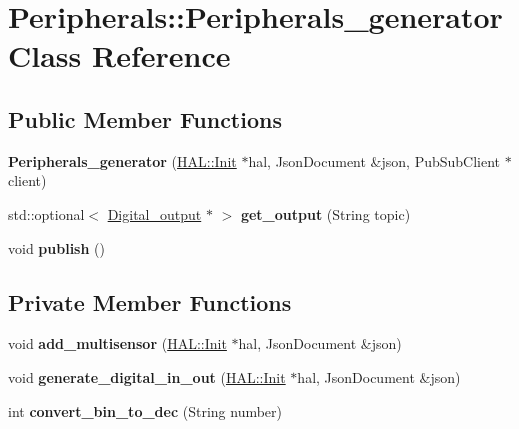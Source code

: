 \hypertarget{class_peripherals_1_1_peripherals__generator}{}\section{Peripherals\+:\+:Peripherals\+\_\+generator Class Reference}
\label{class_peripherals_1_1_peripherals__generator}
\subsection*{Public Member Functions}
\begin{DoxyCompactItemize}
\item 
\mbox{\label{class_peripherals_1_1_peripherals__generator_a9f156c7494e728e720176d6a83c3603d}} 
{\bfseries Peripherals\+\_\+generator} (\hyperlink{class_h_a_l_1_1_init}{H\+A\+L\+::\+Init} $\ast$hal, Json\+Document \&json, Pub\+Sub\+Client $\ast$client)
\item 
\mbox{\label{class_peripherals_1_1_peripherals__generator_a9b9652069a5641aa66d79716b4a946d8}} 
std\+::optional$<$ \hyperlink{class_peripherals_1_1_digital__output}{Digital\+\_\+output} $\ast$ $>$ {\bfseries get\+\_\+output} (String topic)
\item 
\mbox{\label{class_peripherals_1_1_peripherals__generator_a7fee2f98b8ab0fd7aee2fc057a46e9f7}} 
void {\bfseries publish} ()
\end{DoxyCompactItemize}
\subsection*{Private Member Functions}
\begin{DoxyCompactItemize}
\item 
\mbox{\label{class_peripherals_1_1_peripherals__generator_a4626f759446503e34e0acbf50d1887fc}} 
void {\bfseries add\+\_\+multisensor} (\hyperlink{class_h_a_l_1_1_init}{H\+A\+L\+::\+Init} $\ast$hal, Json\+Document \&json)
\item 
\mbox{\label{class_peripherals_1_1_peripherals__generator_a84f9a2a0c6594ec1cf4002b5679804af}} 
void {\bfseries generate\+\_\+digital\+\_\+in\+\_\+out} (\hyperlink{class_h_a_l_1_1_init}{H\+A\+L\+::\+Init} $\ast$hal, Json\+Document \&json)
\item 
\mbox{\label{class_peripherals_1_1_peripherals__generator_a0351544df1fd6ea968c58c6a3bd83e38}} 
int {\bfseries convert\+\_\+bin\+\_\+to\+\_\+dec} (String number)
\end{DoxyCompactItemize}

